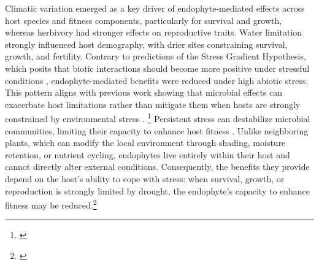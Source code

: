 \documentclass[12pt]{article}\usepackage[]{graphicx}\usepackage[dvipsnames]{xcolor}
\newcommand{\tom}[2]{{\color{red}{#1}}\footnote{\textit{\color{red}{#2}}}}
\newcommand{\jacob}[2]{{\color{blue}{#1}}\footnote{\textit{\color{blue}{#2}}}}
\begin{document}
Climatic variation emerged as a key driver of endophyte‐mediated effects across host species and fitness components, particularly for survival and growth, whereas herbivory had stronger effects on reproductive traits. 
Water limitation strongly influenced host demography, with drier sites constraining survival, growth, and fertility. 
Contrary to predictions of the Stress Gradient Hypothesis, which posits that biotic interactions should become more positive under stressful conditions \citep{louthan2015and,lortie2006re}, endophyte-mediated benefits were reduced under high abiotic stress. 
This pattern aligns with previous work showing that microbial effects can exacerbate host limitations rather than mitigate them when hosts are strongly constrained by environmental stress \citep{david2018microbial}. 
\jacob{Although these studies focused on Florida scrub herbaceous communities under allelopathic and xeric stress, the general principle that host-associated microbes depend on host condition to provide benefits is broadly applicable and consistent with our observations in cool-season grasses.}{I don't know if we need this precision here}
Persistent stress can destabilize microbial communities, limiting their capacity to enhance host fitness \citep{hernandez2021environmental}. 
Unlike neighboring plants, which can modify the local environment through shading, moisture retention, or nutrient cycling, endophytes live entirely within their host and cannot directly alter external conditions. 
Consequently, the benefits they provide depend on the host’s ability to cope with stress: when survival, growth, or reproduction is strongly limited by drought, the endophyte’s capacity to enhance fitness may be reduced.\tom{}{I see you have the stress exacerabation paper here. I don't think this paragraph holds any new ideas. I suggest incorporating some of this into the paragraph above. Otherwise it feels like it is restating the same patterns without any new interpretation. }
\end{document}
